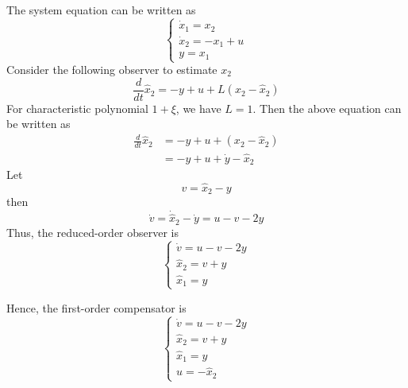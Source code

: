 The system equation can be written as
\begin{equation}
    \begin{cases}
        \dot{x}_1 = x_2 \\ 
        \dot{x}_2 = -x_1+u \\
        y = x_1
    \end{cases}
\end{equation}
Consider the following observer to estimate $x_2$
\begin{equation}
    \frac{d}{dt}\hat{x}_2 = -y+u + L(x_2-\hat{x}_2)
\end{equation}
For characteristic polynomial $1+\xi$, we have $L=1$. Then the above equation can be written as 
\begin{align}
    \frac{d}{dt}\hat{x}_2 &= -y+u + (x_2-\hat{x}_2) \\
    &= -y+u+\dot{y}-\hat{x}_2
\end{align}
Let
\begin{equation}
    v = \hat x_2 - y
\end{equation}
then
\begin{equation}
    \dot v = \dot{\hat{x}}_2 - \dot y = u - v - 2y
\end{equation}
Thus, the reduced-order observer is 
\begin{equation}
    \begin{cases}
        \dot v = u - v - 2y \\
        \hat{x}_2 = v + y \\ 
        \hat{x}_1 = y
    \end{cases}
\end{equation}

Hence, the first-order compensator is 
\begin{equation}
    \begin{cases}
        \dot v = u - v -2y \\
        \hat{x}_2 = v + y \\
        \hat{x}_1 = y \\
        u = -\hat{x}_2
    \end{cases}
\end{equation}


